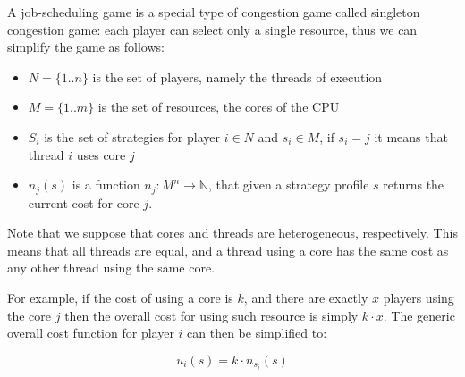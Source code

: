 A job-scheduling game is a special type of congestion game called
singleton congestion game: each player can select only a single
resource, thus we can simplify the game as follows:

\begin{itemize}
\item
  \(N = \{1..n\}\) is the set of players, namely the threads of
  execution
\item
  \(M = \{1..m\}\) is the set of resources, the cores of the CPU
\item
  \(S_i\) is the set of strategies for player \(i\in N\) and
  \(s_i\in M\), if \(s_i = j\) it means that thread \(i\) uses core
  \(j\)
\item
  \(n_j(s)\) is a function \(n_j:M^n\rightarrow\mathbb{N}\), that given
  a strategy profile \(s\) returns the current cost for core \(j\).
\end{itemize}

Note that we suppose that cores and threads are heterogeneous,
respectively. This means that all threads are equal, and a thread using
a core has the same cost as any other thread using the same core.

For example, if the cost of using a core is \(k\), and there are exactly
\(x\) players using the core \(j\) then the overall cost for using such
resource is simply \(k \cdot x\). The generic overall cost function for
player \(i\) can then be simplified to:

\[ u_i(s)= k \cdot n_{s_i}(s) \]

